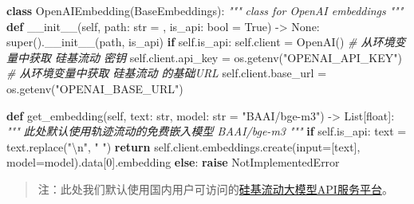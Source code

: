 \documentclass[
]{article}
\newenvironment{Shaded}{}{}
\newcommand{\BuiltInTok}[1]{\textcolor[rgb]{0.00,0.50,0.00}{#1}}
\newcommand{\CharTok}[1]{\textcolor[rgb]{0.25,0.44,0.63}{#1}}
\newcommand{\CommentTok}[1]{\textcolor[rgb]{0.38,0.63,0.69}{\textit{#1}}}
\newcommand{\ControlFlowTok}[1]{\textcolor[rgb]{0.00,0.44,0.13}{\textbf{#1}}}
\newcommand{\DecValTok}[1]{\textcolor[rgb]{0.25,0.63,0.44}{#1}}
\newcommand{\FunctionTok}[1]{\textcolor[rgb]{0.02,0.16,0.49}{#1}}
\newcommand{\KeywordTok}[1]{\textcolor[rgb]{0.00,0.44,0.13}{\textbf{#1}}}
\newcommand{\NormalTok}[1]{#1}
\newcommand{\OperatorTok}[1]{\textcolor[rgb]{0.40,0.40,0.40}{#1}}
\newcommand{\PreprocessorTok}[1]{\textcolor[rgb]{0.74,0.48,0.00}{#1}}
\newcommand{\StringTok}[1]{\textcolor[rgb]{0.25,0.44,0.63}{#1}}
\newcommand{\VariableTok}[1]{\textcolor[rgb]{0.10,0.09,0.49}{#1}}
\begin{document}
\begin{Shaded}
\begin{Highlighting}[]
\KeywordTok{class}\NormalTok{ OpenAIEmbedding(BaseEmbeddings):}
    \CommentTok{"""}
\CommentTok{    class for OpenAI embeddings}
\CommentTok{    """}
    \KeywordTok{def} \FunctionTok{\_\_init\_\_}\NormalTok{(}\VariableTok{self}\NormalTok{, path: }\BuiltInTok{str} \OperatorTok{=} \StringTok{\textquotesingle{}\textquotesingle{}}\NormalTok{, is\_api: }\BuiltInTok{bool} \OperatorTok{=} \VariableTok{True}\NormalTok{) }\OperatorTok{{-}\textgreater{}} \VariableTok{None}\NormalTok{:}
        \BuiltInTok{super}\NormalTok{().}\FunctionTok{\_\_init\_\_}\NormalTok{(path, is\_api)}
        \ControlFlowTok{if} \VariableTok{self}\NormalTok{.is\_api:}
            \VariableTok{self}\NormalTok{.client }\OperatorTok{=}\NormalTok{ OpenAI()}
            \CommentTok{\# 从环境变量中获取 硅基流动 密钥}
            \VariableTok{self}\NormalTok{.client.api\_key }\OperatorTok{=}\NormalTok{ os.getenv(}\StringTok{"OPENAI\_API\_KEY"}\NormalTok{)}
            \CommentTok{\# 从环境变量中获取 硅基流动 的基础URL}
            \VariableTok{self}\NormalTok{.client.base\_url }\OperatorTok{=}\NormalTok{ os.getenv(}\StringTok{"OPENAI\_BASE\_URL"}\NormalTok{)}
    
    \KeywordTok{def}\NormalTok{ get\_embedding(}\VariableTok{self}\NormalTok{, text: }\BuiltInTok{str}\NormalTok{, model: }\BuiltInTok{str} \OperatorTok{=} \StringTok{"BAAI/bge{-}m3"}\NormalTok{) }\OperatorTok{{-}\textgreater{}}\NormalTok{ List[}\BuiltInTok{float}\NormalTok{]:}
        \CommentTok{"""}
\CommentTok{        此处默认使用轨迹流动的免费嵌入模型 BAAI/bge{-}m3}
\CommentTok{        """}
        \ControlFlowTok{if} \VariableTok{self}\NormalTok{.is\_api:}
\NormalTok{            text }\OperatorTok{=}\NormalTok{ text.replace(}\StringTok{"}\CharTok{\textbackslash{}n}\StringTok{"}\NormalTok{, }\StringTok{" "}\NormalTok{)}
            \ControlFlowTok{return} \VariableTok{self}\NormalTok{.client.embeddings.create(}\BuiltInTok{input}\OperatorTok{=}\NormalTok{[text], model}\OperatorTok{=}\NormalTok{model).data[}\DecValTok{0}\NormalTok{].embedding}
        \ControlFlowTok{else}\NormalTok{:}
            \ControlFlowTok{raise} \PreprocessorTok{NotImplementedError}
\end{Highlighting}
\end{Shaded}

\begin{quote}
注：此处我们默认使用国内用户可访问的\href{https://cloud.siliconflow.cn/i/ybUFvmqK}{硅基流动大模型API服务平台}。
\end{quote}
\end{document}
